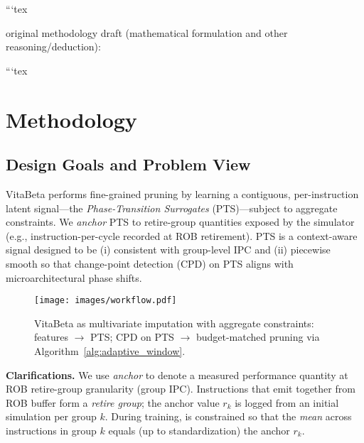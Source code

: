 ```tex


original methodology draft (mathematical formulation and other reasoning/deduction):

```tex



\section{Methodology}
\label{sec:methodology}



\subsection{Design Goals and Problem View}
VitaBeta performs fine-grained pruning by learning a contiguous, per-instruction latent signal---the \emph{Phase-Transition Surrogates} (PTS)---subject to aggregate constraints. We \emph{anchor} PTS to retire-group quantities exposed by the simulator (e.g., instruction-per-cycle recorded at ROB retirement). PTS is a context-aware signal designed to be (i) consistent with group-level IPC and (ii) piecewise smooth so that change-point detection (CPD) on PTS aligns with microarchitectural phase shifts. 

\begin{figure}[!htbp]
    \centering
    \texttt{[image: images/workflow.pdf]}
    \caption{VitaBeta as multivariate imputation with aggregate constraints: features \(\to\) PTS; CPD on PTS \(\to\) budget-matched pruning via Algorithm~\ref{alg:adaptive_window}.}
    \label{fig:workflow}
\end{figure}



\textbf{Clarifications.}
We use \emph{anchor} to denote a measured performance quantity at ROB retire-group granularity (\eg group IPC). Instructions that emit together from ROB buffer form a \emph{retire group}; the anchor value $r_k$ is logged from an initial simulation per group $k$. During training, \pts is constrained so that the \emph{mean} \pts across instructions in group $k$ equals (up to standardization) the anchor $r_k$. 



